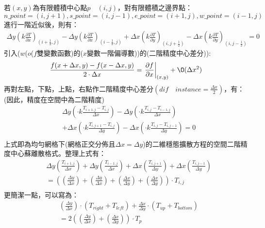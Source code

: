 \documentclass[12pt]{article}
\begin{document}
\noindent 若$(x,y)$為有限體積中心點$p\quad (i,j)$，對有限體積之邊界點：$$n\_point = (i,j+1), s\_point = (i,j-1), e\_point = (i+1,j), w\_point = (i-1,j)$$
進行一階近似後，則有：
\begin{align}
    \Delta y (k \frac{\partial T }{\partial x})_{(i+\frac{1}{2},j)}-\Delta y ( k\frac{\partial T }{\partial x})_{(i-\frac{1}{2},j)} 
    +\Delta x (k \frac{\partial T }{\partial y})_{(i,j+\frac{1}{2})} -\Delta x (k \frac{\partial T }{\partial y})_{(i,j-\frac{1}{2})}
    = 0
\end{align}
\noindent 引入($w$($o$($f$雙變數函數)的($x$變數一階偏導數))的(二階精度中心差分)):
\begin{align}
    \frac{f(x+\Delta x,y)-f(x-\Delta x,y)}{2\cdot \Delta x} = \left.\frac{\partial f }{\partial x} \right|_{(x,y)}+\O(\Delta x^{2})
\end{align}
\noindent 再對左點，下點，上點，右點作二階精度中心差分$(dif\quad instance = \frac{\Delta x}{2})$，有：(因此，精度在空間中為二階精度)
\begin{equation}
    \begin{split}
 &\Delta y (  \cdot k \frac{T_{i+1,j}-T_{i,j}}{\Delta x})- \Delta y (  \cdot k \frac{T_{i,j}-T_{i-1,j}}{\Delta x})\\
 &+ \Delta x (  \cdot k \frac{T_{i,j+1}-T_{i,j}}{\Delta y})- \Delta x (  \cdot k \frac{T_{i,j}-T_{i,j-1}}{\Delta y}) = 0\\
\end{split}
\end{equation}
\noindent 上式即為均勻網格下(網格正交分佈且$\Delta x = \Delta y$)的二維穩態擴散方程的空間二階精度中心蘇離散格式。整理上式有：\\
\begin{equation}
    \begin{split}
 &\Delta y ( \frac{T_{i+1,j}}{\Delta x})+ \Delta y ( \frac{T_{i-1,j}}{\Delta x}) + \Delta x ( \frac{T_{i,j+1}}{\Delta y})+ \Delta x ( \frac{T_{i,j-1}}{\Delta y})\\
 &= (( \frac{\Delta y}{\Delta x})+ ( \frac{\Delta y }{\Delta x}) + ( \frac{\Delta x}{\Delta y})+ ( \frac{\Delta x}{\Delta y}))\cdot T_{i,j}\\
\end{split}
\end{equation}
\noindent 更簡潔一點，可以寫為：
\begin{equation}
    \begin{split}
 &(\frac{\Delta y }{\Delta x})\cdot (T_{right} + T_{left})+  \frac{\Delta x}{\Delta y}\cdot (T_{up} + T_{bottom})\\
 &= 2(( \frac{\Delta y}{\Delta x})+( \frac{\Delta x}{\Delta y}))\cdot T_{p}\\
\end{split}
\end{equation}
\end{document}
